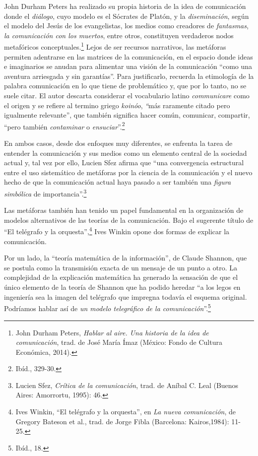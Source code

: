 \documentclass{tufte-handout}
\begin{document}
John Durham Peters ha realizado su propia historia de la idea de
comunicación donde el \emph{diálogo}, cuyo modelo es el Sócrates de
Platón, y la \emph{diseminación}, según el modelo del Jesús de los
evangelistas, los medios como creadores de \emph{fantasmas}, \emph{la
comunicación con los muertos}, entre otros, constituyen verdaderos nodos
metafóricos conceptuales.\footnote{John Durham Peters, \emph{Hablar al
  aire. Una historia de la idea de comunicación}, trad. de José María
  Ímaz (México: Fondo de Cultura Económica, 2014).} Lejos de ser
recursos narrativos, las metáforas permiten adentrarse en las matrices
de la comunicación, en el espacio donde ideas e imaginarios se anudan
para alimentar una visión de la comunicación ``como una aventura
arriesgada y sin garantías''. Para justificarlo, recuerda la etimología
de la palabra comunicación en lo que tiene de problemático y, que por lo
tanto, no se suele citar. El autor descarta considerar el vocabulario
latino \emph{communicare} como el origen y se refiere al termino griego
\emph{koinóo}, \emph{``}más raramente citado pero igualmente
relevante'', que también significa hacer común, comunicar, compartir,
``pero también \emph{contaminar} o \emph{ensuciar}''.\footnote{Ibíd.,
  329-30.}

En ambos casos, desde dos enfoques muy diferentes, se enfrenta la tarea
de entender la comunicación y sus medios como un elemento central de la
sociedad actual y, tal vez por ello, Lucien Sfez afirma que ``una
convergencia estructural entre el uso sistemático de metáforas por la
ciencia de la comunicación y el nuevo hecho de que la comunicación
actual haya pasado a ser también una \emph{figura simbólica} de
importancia''.\footnote{Lucien Sfez, \emph{Crítica de la comunicación},
  trad. de Aníbal C. Leal (Buenos Aires: Amorrortu, 1995): 46.}

Las metáforas también han tenido un papel fundamental en la organización
de modelos alternativos de las teorías de la comunicación. Bajo el
sugerente título de ``El telégrafo y la orquesta'',\footnote{Ives
  Winkin, ``El telégrafo y la orquesta'', en \emph{La nueva
  comunicación}, de Gregory Bateson et al., trad. de Jorge Fibla
  (Barcelona: Kairos,1984): 11-25.} Ives Winkin opone dos formas de
explicar la comunicación.

Por un lado, la ``teoría matemática de la información'', de Claude
Shannon, que se postula como la transmisión exacta de un mensaje de un
punto a otro. La complejidad de la explicación matemática ha generado la
sensación de que el único elemento de la teoría de Shannon que ha podido
heredar ``a los legos en ingeniería sea la imagen del telégrafo que
impregna todavía el esquema original. Podríamos hablar así de \emph{un
modelo telegráfico de la comunicación}''.\footnote{Ibíd., 18.}
\end{document}
